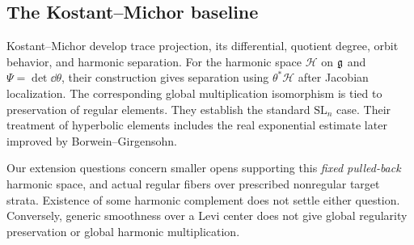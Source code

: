 \subsection{The Kostant--Michor baseline}
Kostant--Michor develop trace projection, its differential, quotient degree, orbit behavior, and harmonic separation. For the harmonic space $\mathcal H$ on $\mathfrak g$ and $\Psi=\det\dd\theta$, their construction gives separation using $\theta^*\mathcal H$ after Jacobian localization. The corresponding global multiplication isomorphism is tied to preservation of regular elements. They establish the standard $\mathrm{SL}_n$ case. Their treatment of hyperbolic elements includes the real exponential estimate later improved by Borwein--Girgensohn.

Our extension questions concern smaller opens supporting this \emph{fixed pulled-back} harmonic space, and actual regular fibers over prescribed nonregular target strata. Existence of some harmonic complement does not settle either question. Conversely, generic smoothness over a Levi center does not give global regularity preservation or global harmonic multiplication.
